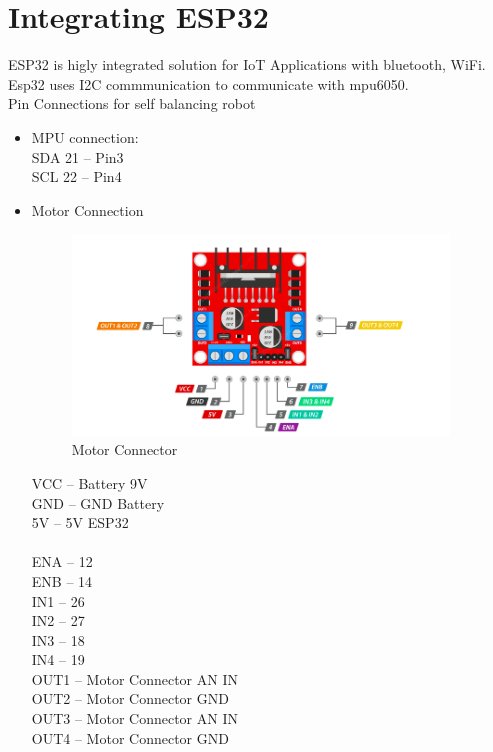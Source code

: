 \documentclass{article}
\begin{document}
  
  \section{Integrating ESP32}
  ESP32 is higly integrated solution for IoT Applications with bluetooth, WiFi. Esp32 uses I2C commmunication to communicate with mpu6050.
  \\  
  Pin Connections for self balancing robot 
  \begin{itemize}
  	\item MPU connection:
  		\\
		SDA 21 -- Pin3
		\\	
		SCL 22 -- Pin4
		\\ 	  
		\item Motor Connection
		\\
			\begin{figure}[h]
 			\centering
 			\includegraphics[width=100mm,scale=0.5]{PinConnection}
 			\caption{Motor Connector}
 			\label{Fig.6: Pin Specification for L298N H-Bridge }
 		\end{figure}
 	
 		VCC	-- Battery 9V\\
 		GND	-- GND Battery\\
 		5V	-- 5V ESP32\\
 		\\
 		ENA -- 12\\
 		ENB -- 14\\
 		IN1	-- 26\\
 		IN2	-- 27\\
 		IN3	-- 18\\
 		IN4	-- 19\\
		
 		OUT1 -- Motor Connector AN IN\\
 		OUT2 -- Motor Connector GND\\
 		OUT3 -- Motor Connector AN IN\\
 		OUT4 -- Motor Connector GND
	\end{itemize}
  
\end{document}
